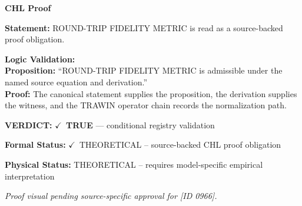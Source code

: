\vspace{0.45em}
\noindent\textbf{CHL Proof}\par
\textbf{Statement:} ROUND-TRIP FIDELITY METRIC is read as a source-backed proof obligation.

\textbf{Logic Validation:}\\
\textbf{Proposition:} ``ROUND-TRIP FIDELITY METRIC is admissible under the named source equation and derivation.''\\
\textbf{Proof:} The canonical statement supplies the proposition, the derivation supplies the witness, and the TRAWIN operator chain records the normalization path.

\textbf{VERDICT:} \ensuremath{\checkmark}\ \textbf{TRUE} --- conditional registry validation

\textbf{Formal Status:} \ensuremath{\checkmark}\ THEORETICAL -- source-backed CHL proof obligation

\textbf{Physical Status:} THEORETICAL -- requires model-specific empirical interpretation
\par\vspace{0.45em}
\par
\vfill
\begingroup\footnotesize\itshape
Proof visual pending source-specific approval for [ID 0966].
\par\endgroup
\vfill
\endgroup
\endgroup
